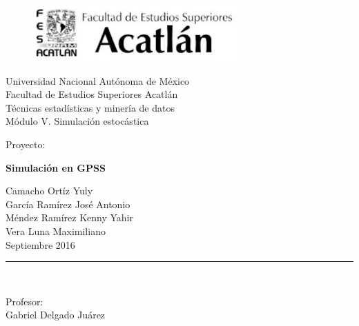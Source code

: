 \usepackage[utf8]{inputenc}
\usepackage{verbatim}
\usepackage{graphicx}
\usepackage[spanish]{babel} 
\usepackage{amsfonts}
\usepackage[table,xcdraw]{xcolor}
\usepackage{enumitem}
\usepackage{listings}
\usepackage{geometry}
\usepackage{setspace}

\begin{titlepage}
\begin{center}
\vspace*{-1in}

\begin{figure}[htb]
\centering
\includegraphics[width=8cm]{fesa.png}
\end{figure}
\vspace*{0.25in}
\large{Universidad Nacional Autónoma de México}\\
\vspace*{0.5in}
Facultad de Estudios Superiores Acatlán\\
\vspace*{0.5in}
Técnicas estadísticas y minería de datos\\
\vspace*{0.5in}
Módulo V. Simulación estocástica\\
\vspace*{0.5in}
\begin{large}
Proyecto:\\
\end{large}
\vspace*{0.2in}
\begin{Large}
\textbf{Simulación en GPSS} \\
\end{Large}
\vspace*{0.5in}
Camacho Ortíz Yuly \\
García Ramírez José Antonio \\
Méndez Ramírez Kenny Yahir \\
Vera Luna Maximiliano \\ 
\vspace*{1in}
Septiembre 2016 \\
\vspace*{0.05in}
\rule{80mm}{0.1mm}\\
\vspace*{0.1in}
\begin{Large}
Profesor: \\
Gabriel Delgado Juárez\\
\end{Large}
\end{center}

\end{titlepage}


